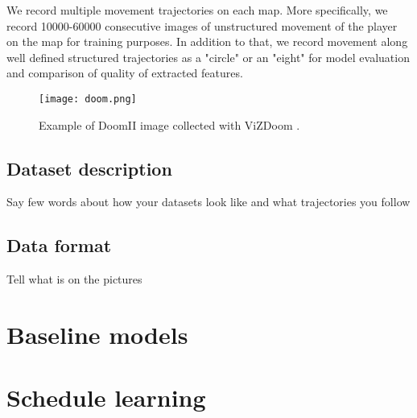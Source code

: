 We record multiple movement trajectories on each map.
More specifically, we record 10000-60000 consecutive images of unstructured movement of the player on the map for training purposes.
In addition to that, we record movement along well defined structured trajectories as a "circle" or an "eight" for model evaluation and comparison of quality of extracted features.


\begin{figure}
\centering
\texttt{[image: doom.png]} %
\caption{Example of DoomII image collected with ViZDoom \cite{Kempka2016}.}
\label{fig:doom}
\end{figure}

\subsection{Dataset description}

Say few words about how your datasets look like and what trajectories you follow

\subsection{Data format}

Tell what is on the pictures



\section{Baseline models}
\section{Schedule learning}
